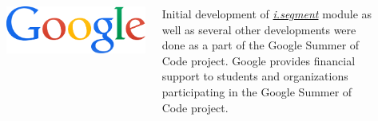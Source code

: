 \documentclass[25pt, margin=0mm, innermargin=15mm, blockverticalspace=15mm, colspace=15mm, subcolspace=8mm]{tikzposter}
\newcommand{\gmodule}[1]{\href{http://grass.osgeo.org/grass72/manuals/#1.html}{\emph{#1}}}
\begin{document}
\begin{columns}
{\bigskip

\begin{minipage}{\listlogowidth}
\includegraphics[width=\linewidth]{google}
\end{minipage}
\listhspace
\begin{minipage}{\listtextwidth}
Initial development of \gmodule{i.segment} module as well as several other developments
were done as a part of the Google Summer of Code project.
Google provides financial support to students and organizations participating in the Google Summer of Code project.
\end{minipage}

\vspace{0.2cm}

\textcolor{gray}{
\hrulefill
}

\vspace{0.1cm}

\newcommand{\qrcodesize}{0.05\linewidth}


\begin{center}
\begin{tabular}{c}



\end{tabular}
\end{center}}
\end{columns}
\end{document}
